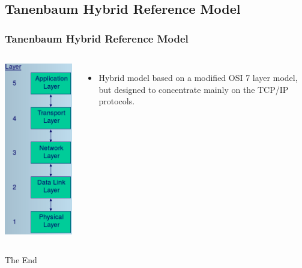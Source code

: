 \documentclass{beamer}
\begin{document}
\subsection{Tanenbaum Hybrid Reference Model}
\begin{frame}
\frametitle{Tanenbaum Hybrid Reference Model}
\begin{columns}[c]
\includegraphics[scale=0.3]{tan.png}
\begin{itemize}
\item Hybrid model based on a modified OSI 7 layer model, but designed to concentrate mainly on the TCP/IP protocols.
\end{itemize}
\end{columns}
\end{frame}
\begin{frame}
\Huge{\centerline{The End}}
\end{frame}

\end{document}
